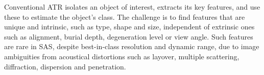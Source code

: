 Conventional ATR isolates an object of interest, extracts its key features, and use these to estimate the object's class. The challenge is to find features that are unique and intrinsic, such as type, shape and size, independent of extrinsic ones such as alignment, burial depth, degeneration level or view angle. Such features are rare in SAS, despite best-in-class resolution and dynamic range, due to image ambiguities from acoustical distortions such as layover, multiple scattering, diffraction, dispersion and penetration.



%
%




%
%
%

%
%
%
%
%
%





